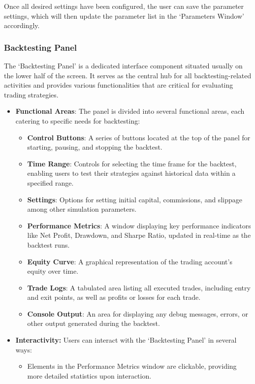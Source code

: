 Once all desired settings have been configured, the user can save the parameter settings, which will then update the parameter list in the `Parameters Window' accordingly.


\subsubsection{Backtesting Panel}
\label{sec:backtest}

The `Backtesting Panel' is a dedicated interface component situated usually on the lower half of the screen. It serves as the central hub for all backtesting-related activities and provides various functionalities that are critical for evaluating trading strategies.

\begin{itemize}
  \item \textbf{Functional Areas}: The panel is divided into several functional areas, each catering to specific needs for backtesting:
  \begin{itemize}
    \item \textbf{Control Buttons}: A series of buttons located at the top of the panel for starting, pausing, and stopping the backtest.
    
    \item \textbf{Time Range}: Controls for selecting the time frame for the backtest, enabling users to test their strategies against historical data within a specified range.
    
    \item \textbf{Settings}: Options for setting initial capital, commissions, and slippage among other simulation parameters.
    
    \item \textbf{Performance Metrics}: A window displaying key performance indicators like Net Profit, Drawdown, and Sharpe Ratio, updated in real-time as the backtest runs.
    
    \item \textbf{Equity Curve}: A graphical representation of the trading account's equity over time.
    
    \item \textbf{Trade Logs}: A tabulated area listing all executed trades, including entry and exit points, as well as profits or losses for each trade.
    
    \item \textbf{Console Output}: An area for displaying any debug messages, errors, or other output generated during the backtest.
  \end{itemize}
  \item \textbf{Interactivity:} Users can interact with the `Backtesting Panel' in several ways:
  \begin{itemize}
    \item Elements in the Performance Metrics window are clickable, providing more detailed statistics upon interaction.
    

\end{itemize}
\end{itemize}
